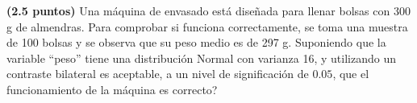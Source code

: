 
\textbf{(2.5 puntos)} Una máquina de envasado está diseñada para llenar bolsas con 300 g de almendras. Para comprobar si funciona correctamente, se toma una muestra de 100 bolsas y se observa que su peso medio es de 297 g. Suponiendo que la variable ``peso'' tiene una distribución Normal con varianza 16, y utilizando un contraste bilateral \textquestiondown{}es aceptable, a un nivel de significación de $0.05$, que el funcionamiento de la máquina es correcto?
